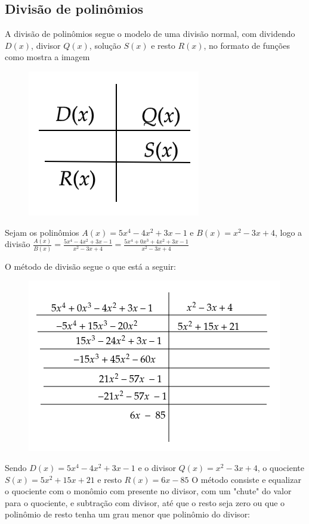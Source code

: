 \begin{multicols*}{2}
            \subsection*{Divisão de polinômios}
            A divisão de polinômios segue o modelo de uma divisão normal, com dividendo $D(x)$, divisor 			$Q(x)$, solução $S(x)$ e resto $R(x)$, no formato de funções como mostra a imagem
            \begin{figure}[H]
                \includegraphics[scale=0.3]{assets/rafael/img21.png}
            \end{figure}
            
            Sejam os polinômios $A(x) = 5x^4 - 4x^2 + 3x - 1 $ e $B(x) = x^2 - 3x + 4$, logo a divisão 
            $\frac{A(x)}{B(x)} = \frac{ 5x^4 - 4x^2 + 3x - 1 }{x^2 - 3x + 4} =
             \frac{ 5x^4 +0x^3 + 4x^2 + 3x - 1 }{x^2 - 3x + 4} $
             
             O método de divisão segue o que está a seguir:
             \begin{figure}[H]
                \includegraphics[scale=0.5]{assets/rafael/img22.png}
            \end{figure}
             Sendo $D(x) = 5x^4 - 4x^2 + 3x - 1$ e o divisor $Q(x) = x^2 - 3x + 4$, o quociente 
             $S(x) = 5x^2 + 15x +21$ e resto $R(x) = 6x -85$
             O método consiste e equalizar o quociente com o monômio com presente no divisor, com um 				"chute" do valor para o quociente, e subtração com divisor, até que o resto seja zero ou que o 			polinômio de resto tenha um grau menor que polinômio do divisor:
             

\end{multicols*}
